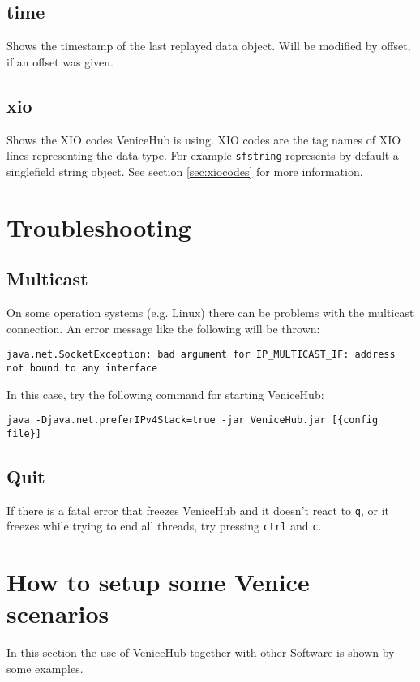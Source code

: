 \documentclass[german,a4paper]{article}
\begin{document}
\subsection{time}
Shows the timestamp of the last replayed data object. Will be modified by offset, if an offset was given.

\subsection{xio}
Shows the XIO codes VeniceHub is using. XIO codes are the tag names of XIO lines representing the data type. For example \texttt{sfstring} represents by default a singlefield string object. See section \ref{sec:xiocodes} for more information.


\section{Troubleshooting}

\subsection{Multicast}
\label{sec:mc_prob}
On some operation systems (e.g. Linux) there can be problems with the multicast connection. An error message like the following will be thrown:
\begin{lstlisting}
java.net.SocketException: bad argument for IP_MULTICAST_IF: address not bound to any interface
\end{lstlisting}
In this case, try the following command for starting VeniceHub:
\begin{lstlisting}
java -Djava.net.preferIPv4Stack=true -jar VeniceHub.jar [{config file}]
\end{lstlisting}

\subsection{Quit}
\label{sec:quit_prob}
If there is a fatal error that freezes VeniceHub and it doesn't react to \texttt{q}, or it freezes while trying to end all threads, try pressing \texttt{ctrl} and \texttt{c}.


\section{How to setup some Venice scenarios}

In this section the use of VeniceHub together with other Software is shown by some examples.
\end{document}
